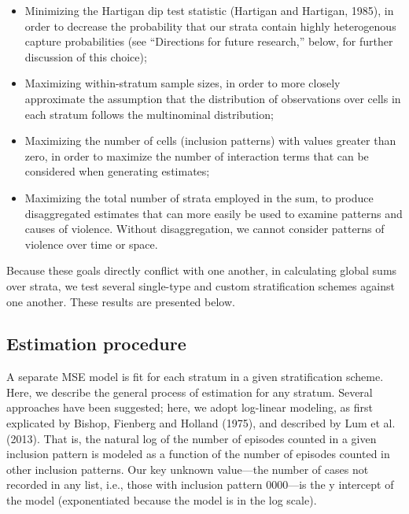 \documentclass[11pt,]{article}
\providecommand{\tightlist}{%
  \setlength{\itemsep}{0pt}\setlength{\parskip}{0pt}}
\begin{document}
\begin{itemize}
\tightlist
\item
  Minimizing the Hartigan dip test statistic (Hartigan and Hartigan,
  1985), in order to decrease the probability that our strata contain
  highly heterogenous capture probabilities (see ``Directions for future
  research,'' below, for further discussion of this choice);
\item
  Maximizing within-stratum sample sizes, in order to more closely
  approximate the assumption that the distribution of observations over
  cells in each stratum follows the multinominal distribution;
\item
  Maximizing the number of cells (inclusion patterns) with values
  greater than zero, in order to maximize the number of interaction
  terms that can be considered when generating estimates;
\item
  Maximizing the total number of strata employed in the sum, to produce
  disaggregated estimates that can more easily be used to examine
  patterns and causes of violence. Without disaggregation, we cannot
  consider patterns of violence over time or space.
\end{itemize}

Because these goals directly conflict with one another, in calculating
global sums over strata, we test several single-type and custom
stratification schemes against one another. These results are presented
below.

\hypertarget{estimation-procedure}{%
\subsection{Estimation procedure}\label{estimation-procedure}}

A separate MSE model is fit for each stratum in a given stratification
scheme. Here, we describe the general process of estimation for any
stratum. Several approaches have been suggested; here, we adopt
log-linear modeling, as first explicated by Bishop, Fienberg and Holland
(1975), and described by Lum et al. (2013). That is, the natural log of
the number of episodes counted in a given inclusion pattern is modeled
as a function of the number of episodes counted in other inclusion
patterns. Our key unknown value---the number of cases not recorded in
any list, i.e., those with inclusion pattern 0000---is the y intercept
of the model (exponentiated because the model is in the log scale).
\end{document}
